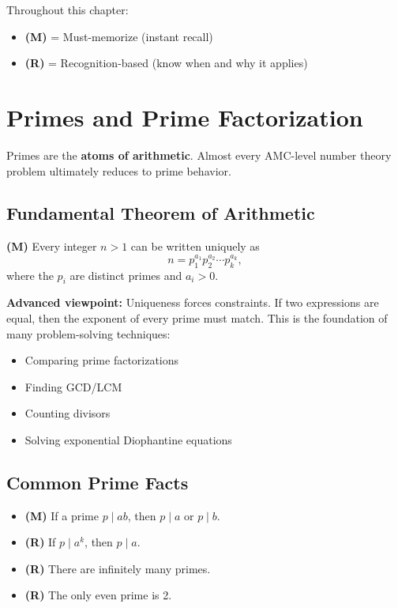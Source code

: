 \documentclass[12pt]{extarticle}
\begin{document}
Throughout this chapter:
\begin{itemize}
\item \textbf{(M)} = Must-memorize (instant recall)
\item \textbf{(R)} = Recognition-based (know when and why it applies)
\end{itemize}

\section{Primes and Prime Factorization}

Primes are the \textbf{atoms of arithmetic}. Almost every AMC-level number theory problem ultimately reduces to prime behavior.

\subsection*{Fundamental Theorem of Arithmetic}

\begin{theorembox}
\textbf{(M)} Every integer $n>1$ can be written uniquely as
\[
n = p_1^{a_1} p_2^{a_2} \cdots p_k^{a_k},
\]
where the $p_i$ are distinct primes and $a_i > 0$.
\end{theorembox}

\begin{conceptbox}
\textbf{Advanced viewpoint:} Uniqueness forces constraints. If two expressions are equal, then the exponent of every prime must match. This is the foundation of many problem-solving techniques:
\begin{itemize}
    \item Comparing prime factorizations
    \item Finding GCD/LCM
    \item Counting divisors
    \item Solving exponential Diophantine equations
\end{itemize}
\end{conceptbox}

\subsection*{Common Prime Facts}
\begin{itemize}
\item \textbf{(M)} If a prime $p \mid ab$, then $p \mid a$ or $p \mid b$.
\item \textbf{(R)} If $p \mid a^k$, then $p \mid a$.
\item \textbf{(R)} There are infinitely many primes.
\item \textbf{(R)} The only even prime is 2.
\end{itemize}
\end{document}
